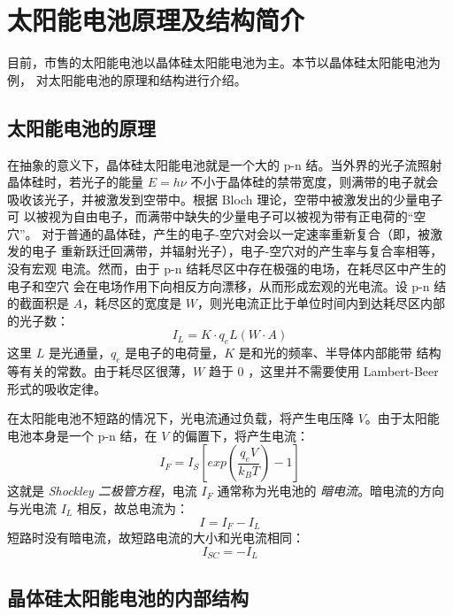 \section{太阳能电池原理及结构简介}

目前，市售的太阳能电池以晶体硅太阳能电池为主。本节以晶体硅太阳能电池为例，
对太阳能电池的原理和结构进行介绍。

\subsection{太阳能电池的原理}

在抽象的意义下，晶体硅太阳能电池就是一个大的 p-n 结。当外界的光子流照射
晶体硅时，若光子的能量 $E = h\nu$ 不小于晶体硅的禁带宽度，则满带的电子就会
吸收该光子，并被激发到空带中。根据 Bloch 理论，空带中被激发出的少量电子可
以被视为自由电子，而满带中缺失的少量电子可以被视为带有正电荷的“空穴”。
对于普通的晶体硅，产生的电子-空穴对会以一定速率重新复合（即，被激发的电子
重新跃迁回满带，并辐射光子），电子-空穴对的产生率与复合率相等，没有宏观
电流。然而，由于 p-n 结耗尽区中存在极强的电场，在耗尽区中产生的电子和空穴
会在电场作用下向相反方向漂移，从而形成宏观的光电流。设 p-n 结的截面积是
$A$，耗尽区的宽度是 $W$，则光电流正比于单位时间内到达耗尽区内部的光子数：
\begin{equation} \label{eqn:LightCurrent}
I_L = K \cdot q_e L(W \cdot A)
\end{equation}
这里 $L$ 是光通量，$q_e$ 是电子的电荷量，$K$ 是和光的频率、半导体内部能带
结构等有关的常数。由于耗尽区很薄，$W$ 趋于 $0$ ，这里并不需要使用
Lambert-Beer 形式的吸收定律。

在太阳能电池不短路的情况下，光电流通过负载，将产生电压降 $V$。由于太阳能
电池本身是一个 p-n 结，在 $V$ 的偏置下，将产生电流：
\begin{equation} \label{eqn:Shockley}
I_F = I_S \left[ exp \left(\frac{q_e V}{k_B T} \right) - 1 \right]
\end{equation}
这就是 \emph{Shockley 二极管方程}，电流 $I_F$ 通常称为光电池的
\emph{暗电流}。暗电流的方向与光电流 $I_L$ 相反，故总电流为：
\begin{equation} \label{eqn:TotalCurrent}
I = I_F - I_L
\end{equation}
短路时没有暗电流，故短路电流的大小和光电流相同：
\begin{equation} \label{eqn:SCCurrent}
I_{SC} = -I_L
\end{equation}

\subsection{晶体硅太阳能电池的内部结构}

